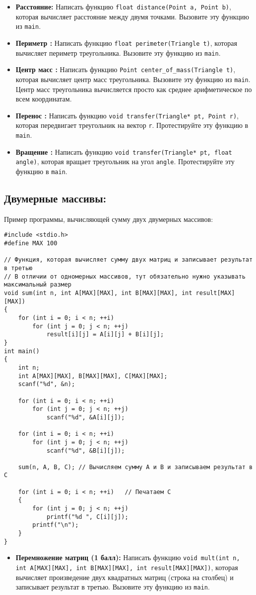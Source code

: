 \documentclass{article}
\begin{document}
\begin{itemize}
\item \textbf{Расстояние:} Написать функцию \texttt{float distance(Point a, Point b)}, которая вычисляет расстояние между двумя точками. Вызовите эту функцию из \texttt{main}.
\item \textbf{Периметр :} Написать функцию \texttt{float perimeter(Triangle t)}, которая вычисляет периметр треугольника. Вызовите эту функцию из \texttt{main}.
\item \textbf{Центр масс :} Написать функцию \texttt{Point center\_of\_mass(Triangle t)}, которая вычисляет центр масс треугольника. Вызовите эту функцию из \texttt{main}. Центр масс треугольника вычисляется просто как среднее арифметическое по всем координатам.

\item \textbf{Перенос :} Написать функцию \texttt{void transfer(Triangle* pt, Point r)}, которая передвигает треугольник на вектор \texttt{r}. Протестируйте эту функцию в  \texttt{main}.

\item \textbf{Вращение :} Написать функцию \texttt{void transfer(Triangle* pt, float angle)}, которая вращает треугольник на угол \texttt{angle}. Протестируйте эту функцию в  \texttt{main}.
\end{itemize}

\newpage
\subsection*{Двумерные массивы:}
Пример программы, вычисляющей сумму двух двумерных массивов:
\begin{lstlisting}
#include <stdio.h>
#define MAX 100

// Функция, которая вычисляет сумму двух матриц и записывает результат в третью
// В отличии от одномерных массивов, тут обязательно нужно указывать максимальный размер
void sum(int n, int A[MAX][MAX], int B[MAX][MAX], int result[MAX][MAX])
{
    for (int i = 0; i < n; ++i)
        for (int j = 0; j < n; ++j)
            result[i][j] = A[i][j] + B[i][j];
}
int main()
{
    int n;
    int A[MAX][MAX], B[MAX][MAX], C[MAX][MAX];
    scanf("%d", &n);
    
    for (int i = 0; i < n; ++i)
        for (int j = 0; j < n; ++j)
            scanf("%d", &A[i][j]);
         
    for (int i = 0; i < n; ++i)
        for (int j = 0; j < n; ++j)
            scanf("%d", &B[i][j]);
            
    sum(n, A, B, C); // Вычисляем сумму A и B и записываем результат в C
    
    for (int i = 0; i < n; ++i)   // Печатаем C
    {
        for (int j = 0; j < n; ++j)
            printf("%d ", C[i][j]);
        printf("\n");
    }
}
\end{lstlisting}
\begin{itemize}
\item \textbf{Перемножение матриц (1 балл):} Написать функцию \texttt{void mult(int n, int A[MAX][MAX], int B[MAX][MAX], int result[MAX][MAX])}, которая вычисляет произведение двух квадратных матриц (строка на столбец) и записывает результат в третью. Вызовите эту функцию из \texttt{main}.
\end{itemize}
\end{document}
